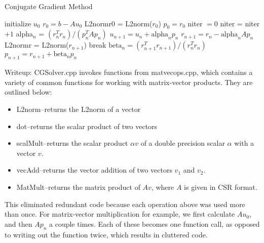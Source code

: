 \documentclass{article}
\begin{document}
\begin{algorithm}
\caption{Conjugate Gradient Method}
\begin{algorithmic}	
	\STATE initialize $u_0$
	\STATE $r_0 = b-Au_0$
	\STATE L2normr0 = L2norm($r_0$)
	\STATE $p_0 = r_0$
	\STATE niter $=0$
		\STATE niter = niter $+1$
		\STATE alpha$_n$ = $(r_n^Tr_n)/(p_n^TAp_n)$
		\STATE $u_{n+1} = u_n+\text{alpha}_np_n$
		\STATE $r_{n+1} = r_n - \text{alpha}_nAp_n$
		\STATE L2normr = L2norm($r_{n+1}$)
		\STATE break
		\ENDIF
		\STATE $\text{beta}_n = (r_{n+1}^Tr_{n+1})/(r_n^Tr_n)$
		\STATE $p_{n+1} = r_{n+1} + \text{beta}_np_n$
		
	\ENDWHILE
\end{algorithmic}
\end{algorithm}

Writeup: CGSolver.cpp invokes functions from matvecops.cpp, which contains a variety of common functions for working with matrix-vector products.  They are outlined below:
\begin{itemize}
\item L2norm--returns the L2norm of a vector
\item dot--returns the scalar product of two vectors
\item scalMult--returns the scalar product $\alpha v$ of a double precision scalar $\alpha$ with a vector $v$.
\item vecAdd--returns the vector addition of two vectors $v_1$ and $v_2$.  
\item MatMult--returns the matrix product of $Av$, where $A$ is given in CSR format.

\end{itemize}

This eliminated redundant code because each operation above was used more than once.  For matrix-vector multiplication for example, we first calculate $Au_0$, and then $Ap_n$ a couple times.  Each of these becomes one function call, as opposed to writing out the function twice, which results in cluttered code.
\end{document}
